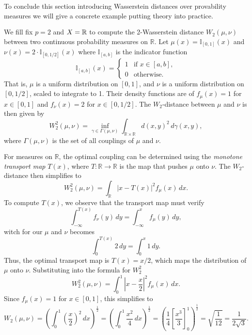 To conclude this section introducing Wasserstein distances over provability measures we will give a concrete example putting theory into practice.

\begin{example}
    We fill fix $ p = 2 $ and $ X = \mathbb R $ to compute the 2-Wasserstein distance $W_2(\mu, \nu)$ between two continuous probability measures on $\mathbb{R}$. Let $\mu(x) = \mathbb{I}_{[0,1]}(x)$ and $\nu(x) = 2 \cdot \mathbb{I}_{[0,1/2]}(x)$
    where $\mathbb{I}_{[a,b]}$ is the indicator function
    $$
    \mathbb{I}_{[a,b]}(x) = 
    \begin{cases}
    1 & \text{if } x \in [a,b], \\
    0 & \text{otherwise.}
    \end{cases}
    $$
    That is, $\mu$ is a uniform distribution on $[0,1]$, and $\nu$ is a uniform distribution on $[0,1/2]$, scaled to integrate to 1. Their density functions are of $ f_\mu(x) = 1 $ for $x \in [0,1] $ and $ f_\nu(x) = 2 $ for $x \in [0,1/2] $. The $W_2$-distance between $\mu$ and $\nu$ is then given by
    $$
    W_2^2(\mu, \nu) = \inf_{\gamma \in \Gamma(\mu, \nu)} \int_{\mathbb{R} \times \mathbb{R}} d(x, y)^2 \, d\gamma(x, y),
    $$
    where $\Gamma(\mu, \nu)$ is the set of all couplings of $\mu$ and $\nu$.
    
    For measures on $\mathbb{R}$, the optimal coupling can be determined using the \emph{monotone transport map} $T(x)$, where $T: \mathbb{R} \to \mathbb{R}$ is the map that pushes $\mu$ onto $\nu$. The $W_2$-distance then simplifies to
    $$
    W_2^2(\mu, \nu) = \int_\mathbb{R} |x - T(x)|^2 f_\mu(x) \, dx.
    $$
    To compute $T(x)$, we observe that the transport map must verify
    $$
    \int_{-\infty}^{T(x)} f_\nu(y) \, dy = \int_{-\infty}^x f_\mu(y) \, dy,
    $$
    witch for our $\mu$ and $\nu$ becomes
    $$
    \int_{0}^{T(x)} 2 \, dy = \int_{0}^x 1 \, dy.
    $$
    Thus, the optimal transport map is $T(x) = x/2$, which maps the distribution of $\mu$ onto $\nu$. Substituting into the formula for $W_2^2$
    $$
    W_2^2(\mu, \nu) = \int_0^1 \left|x - \frac{x}{2}\right|^2 f_\mu(x) \, dx.
    $$
    Since $f_\mu(x) = 1$ for $x \in [0,1]$, this simplifies to
    $$
    W_2(\mu, \nu) = \left(\int_0^1 \left(\frac{x}{2}\right)^2 \, dx\right)^\frac{1}{2} =
    \left(\int_0^1 \frac{x^2}{4} \, dx\right)^\frac{1}{2} =
    \left(\frac{1}{4}\left[\frac{x^3}{3}\right]_0^1\right)^\frac{1}{2} =
    \sqrt{\frac{1}{12}} = \frac{1}{2\sqrt{3}}.
    $$
\end{example}